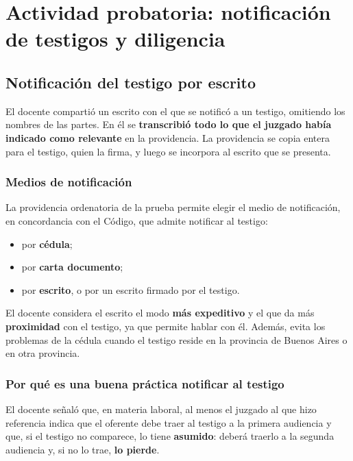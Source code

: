 \documentclass[12pt,oneside]{book}
\begin{document}
\chapter[Prueba testimonial y diligencia]{Actividad probatoria: notificación de testigos y diligencia}

\section{Notificación del testigo por escrito}

El docente compartió un escrito con el que se notificó a un testigo, omitiendo los nombres de las partes. En él se \textbf{transcribió todo lo que el juzgado había indicado como relevante} en la providencia. La providencia se copia entera para el testigo, quien la firma, y luego se incorpora al escrito que se presenta.

\subsection{Medios de notificación}

La providencia ordenatoria de la prueba permite elegir el medio de notificación, en concordancia con el Código, que admite notificar al testigo:

\begin{itemize}
    \item por \textbf{cédula};
    \item por \textbf{carta documento};
    \item por \textbf{escrito}, o por un escrito firmado por el testigo.
\end{itemize}

El docente considera el escrito el modo \textbf{más expeditivo} y el que da más \textbf{proximidad} con el testigo, ya que permite hablar con él. Además, evita los problemas de la cédula cuando el testigo reside en la provincia de Buenos Aires o en otra provincia.

\subsection{Por qué es una buena práctica notificar al testigo}

El docente señaló que, en materia laboral, al menos el juzgado al que hizo referencia indica que el oferente debe traer al testigo a la primera audiencia y que, si el testigo no comparece, lo tiene \textbf{asumido}: deberá traerlo a la segunda audiencia y, si no lo trae, \textbf{lo pierde}.
\end{document}
